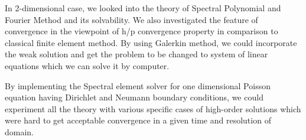 
In 2-dimensional case, we looked into the theory of Spectral
Polynomial and Fourier Method and its solvability. We also
investigated the feature of convergence in the viewpoint of h/p
convergence property in comparison to classical finite element
method. By using Galerkin method, we could incorporate the weak
solution and get the problem to be changed to system of linear
equations which we can solve it by computer.

By implementing the Spectral element solver for one dimensional Poisson equation having Dirichlet and Neumann boundary conditions, we could experiment all the theory with various specific cases of high-order solutions which were hard to get acceptable convergence in a given time and resolution of domain.
